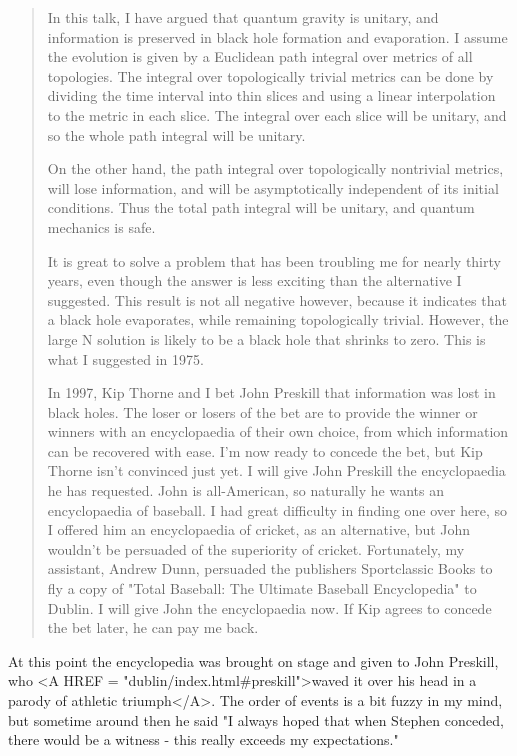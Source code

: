 \begin{quote}
     In this talk, I have argued that quantum gravity is unitary, and
     information is preserved in black hole formation and evaporation. 
     I assume the evolution is given by a Euclidean path integral over
     metrics of all topologies. The integral over topologically trivial
     metrics can be done by dividing the time interval into thin slices
     and using a linear interpolation to the metric in each slice.  The
     integral over each slice will be unitary, and so the whole path
     integral will be unitary.

     On the other hand, the path integral over topologically nontrivial
     metrics, will lose information, and will be asymptotically independent
     of its initial conditions. Thus the total path integral will be
     unitary, and quantum mechanics is safe.

     It is great to solve a problem that has been troubling me for nearly
     thirty years, even though the answer is less exciting than the
     alternative I suggested.  This result is not all negative however,
     because it indicates that a black hole evaporates, while remaining
     topologically trivial.  However, the large N solution is likely to 
     be a black hole that shrinks to zero.  This is what I suggested in 1975.

     In 1997, Kip Thorne and I bet John Preskill that information was
     lost in black holes.  The loser or losers of the bet are to provide
     the winner or winners with an encyclopaedia of their own choice, from
     which information can be recovered with ease.  I'm now ready to concede
     the bet, but Kip Thorne isn't convinced just yet.  I will give John
     Preskill the encyclopaedia he has requested.  John is all-American, so
     naturally he wants an encyclopaedia of baseball.  I had great difficulty 
     in finding one over here, so I offered him an encyclopaedia of cricket, 
     as an alternative, but John wouldn't be persuaded of the superiority 
     of cricket.  Fortunately, my assistant, Andrew Dunn, persuaded the 
     publishers Sportclassic Books to fly a copy of "Total Baseball: The 
     Ultimate Baseball Encyclopedia" to Dublin.  I will give John the 
     encyclopaedia now.  If Kip agrees to concede the bet later, he
     can pay me back.

\end{quote}
At this point the encyclopedia was brought on stage and given
to John Preskill, who <A HREF = "dublin/index.html#preskill">waved it over his 
head in a parody of athletic triumph</A>.  The order of events is 
a bit fuzzy in my
mind, but sometime around then he said "I always hoped that when 
Stephen conceded, there would be a witness - this really exceeds 
my expectations."

